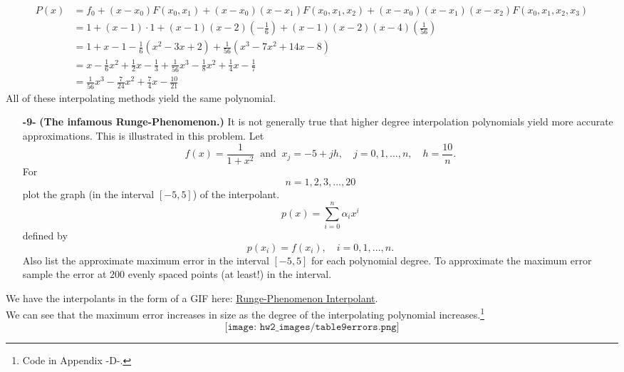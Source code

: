 \documentclass[11pt]{article}
\theoremstyle{definition}
\newcommand{\1}[1]{\mathbf{1} \left \{ #1 \right \}}
\begin{document}
\begin{equation*}
    \begin{split}
        P(x) &= f_0 + (x-x_0) F(x_0 , x_1) + (x-x_0)(x-x_1) F(x_0 , x_1 , x_2) + (x-x_0)(x-x_1)(x-x_2) F(x_0 , x_1 , x_2 , x_3) \\
        &= 1 + (x-1) \cdot 1 + (x-1)(x-2)\left(-\frac{1}{6}\right) + (x-1)(x-2)(x-4)\left(\frac{1}{56}\right) \\
        &= 1 + x - 1 - \frac{1}{6}(x^2 -3x+2) + \frac{1}{56}(x^3 -7x^2 +14x-8) \\
        &= x - \frac{1}{6}x^2 + \frac{1}{2}x - \frac{1}{3} + \frac{1}{56}x^3 - \frac{1}{8}x^2 + \frac{1}{4}x - \frac{1}{7} \\
        &= \frac{1}{56}x^3 - \frac{7}{24}x^2 + \frac{7}{4}x - \frac{10}{21}
    \end{split}
\end{equation*}
All of these interpolating methods yield the same polynomial.

\begin{itemize}
    \item[{\textbf{-9-}}] \textbf{(The infamous Runge-Phenomenon.)}  It is not generally true that higher degree interpolation polynomials yield more accurate approximations.  This is illustrated in this problem.  Let
    \[f(x) = \frac{1}{1+x^2} \ \text{ and } \ x_j = -5+jh, \quad j = 0,1,...,n, \quad h=\frac{10}{n}.\]
    For
    \[n = 1,2,3,...,20\]
    plot the graph (in the interval $[-5,5]$) of the interpolant.
    \[p(x) = \sum_{i=0}^n \alpha_i x^i\]
    defined by
    \[p(x_i) = f(x_i), \quad i = 0,1,...,n.\]
    Also list the approximate maximum error in the interval $[-5,5]$ for each polynomial degree.  To approximate the maximum error sample the error at $200$ evenly spaced points (at least!) in the interval.
\end{itemize}
We have the interpolants in the form of a GIF here: \href{https://github.com/3rundane/Numerical-Analysis-Project/blob/main/homework\%202\%20gifs/problem9.gif}{Runge-Phenomenon Interpolant}. \\
We can see that the maximum error increases in size as the degree of the interpolating polynomial increases.\footnote{Code in Appendix -D-.}
\[\texttt{[image: hw2\_images/table9errors.png]}\]
\end{document}
